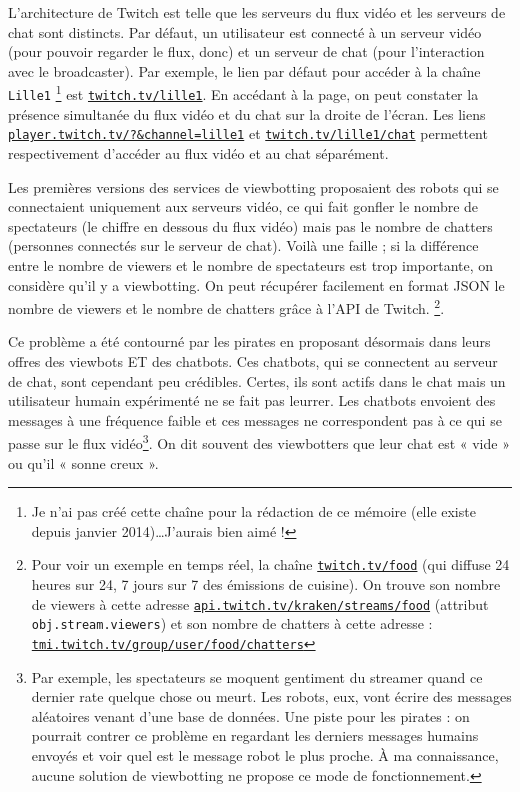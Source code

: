 \documentclass[a4paper]{article}
\begin{document}
L'architecture de Twitch est telle que les serveurs du flux vidéo et les serveurs de chat sont distincts. Par défaut, un utilisateur est connecté à un serveur vidéo (pour pouvoir regarder le flux, donc) et un serveur de chat (pour l'interaction avec le broadcaster). Par exemple, le lien par défaut pour accéder à la chaîne \texttt{Lille1} \footnote{Je n'ai pas créé cette chaîne pour la rédaction de ce mémoire (elle existe depuis janvier 2014)\ldots J'aurais bien aimé !} est \href{https://www.twitch.tv/lille1}{\texttt{twitch.tv/lille1}}. En accédant à la page, on peut constater la présence simultanée du flux vidéo et du chat sur la droite de l'écran. Les liens \href{https://player.twitch.tv/?\&channel=lille1}{\texttt{player.twitch.tv/?\&channel=lille1}} et \href{https://www.twitch.tv/lille1/chat}{\texttt{twitch.tv/lille1/chat}} permettent respectivement d'accéder au flux vidéo et au chat séparément.

Les premières versions des services de viewbotting proposaient des robots qui se connectaient uniquement aux serveurs vidéo, ce qui fait gonfler le nombre de spectateurs (le chiffre en dessous du flux vidéo) mais pas le nombre de chatters (personnes connectés sur le serveur de chat). Voilà une faille ; si la différence entre le nombre de viewers et le nombre de spectateurs est trop importante, on considère qu'il y a viewbotting. On peut récupérer facilement en format JSON le nombre de viewers et le nombre de chatters grâce à l'API de Twitch. \footnote{Pour voir un exemple en temps réel, la chaîne \href{https://www.twitch.tv/food}{\texttt{twitch.tv/food}} (qui diffuse 24 heures sur 24, 7 jours sur 7 des émissions de cuisine). On trouve son nombre de viewers à cette adresse \href{https://api.twitch.tv/kraken/streams/food}{\texttt{api.twitch.tv/kraken/streams/food}} (attribut \texttt{obj.stream.viewers}) et son nombre de chatters à cette adresse : \href{http://tmi.twitch.tv/group/user/food/chatters}{\texttt{tmi.twitch.tv/group/user/food/chatters}}}.

Ce problème a été contourné par les pirates en proposant désormais dans leurs offres des viewbots ET des chatbots. Ces chatbots, qui se connectent au serveur de chat, sont cependant peu crédibles. Certes, ils sont actifs dans le chat mais un utilisateur humain expérimenté ne se fait pas leurrer. Les chatbots envoient des messages à une fréquence faible et ces messages ne correspondent pas à ce qui se passe sur le flux vidéo\footnote{Par exemple, les spectateurs se moquent gentiment du streamer quand ce dernier rate quelque chose ou meurt. Les robots, eux, vont écrire des messages aléatoires venant d'une base de données. Une piste pour les pirates : on pourrait contrer ce problème en regardant les derniers messages humains envoyés et voir quel est le message robot le plus proche. À ma connaissance, aucune solution de viewbotting ne propose ce mode de fonctionnement.}. On dit souvent des viewbotters que leur chat est « vide » ou qu'il « sonne creux ».
\end{document}
